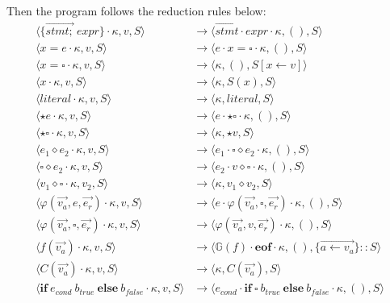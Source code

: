 \documentclass[a4paper,11pt]{article}
\newcommand\rtstate[3]{\langle #1, #2, #3\rangle}
\begin{document}
Then the program follows the reduction rules below:
\begin{align*}
\rtstate{\{\overrightarrow{stmt;}\ expr\} \cdot \kappa}{v}{S} &\rightarrow \rtstate{\overrightarrow{stmt} \cdot expr \cdot \kappa}{()}{S}\\
\rtstate{x = e \cdot \kappa}{v}{S} &\rightarrow \rtstate{e \cdot x = \square \cdot \kappa}{()}{S}\\
\rtstate{x = \square \cdot \kappa}{v}{S} &\rightarrow \rtstate{\kappa}{()}{S[x \leftarrow v]}\\
\rtstate{x \cdot \kappa}{v}{S} &\rightarrow \rtstate{\kappa}{S(x)}{S}\\
\rtstate{literal \cdot \kappa}{v}{S} &\rightarrow \rtstate{\kappa}{literal}{S}\\
\rtstate{\star e \cdot \kappa}{v}{S} &\rightarrow \rtstate{e \cdot \star \square \cdot \kappa}{()}{S}\\
\rtstate{\star \square \cdot \kappa}{v}{S} &\rightarrow \rtstate{\kappa}{\star v}{S}\\
\rtstate{e_1 \diamond e_2 \cdot \kappa}{v}{S} &\rightarrow \rtstate{e_1 \cdot \square \diamond e_2 \cdot \kappa}{()}{S}\\
\rtstate{\square \diamond e_2 \cdot \kappa}{v}{S} &\rightarrow \rtstate{e_2 \cdot v \diamond \square \cdot \kappa}{()}{S}\\
\rtstate{v_1 \diamond \square \cdot \kappa}{v_2}{S} &\rightarrow \rtstate{\kappa}{v_1 \diamond v_2}{S}\\
\rtstate{\varphi(\overrightarrow{v_a}, e, \overrightarrow{e_r}) \cdot \kappa}{v}{S} &\rightarrow \rtstate{e \cdot \varphi(\overrightarrow{v_a}, \square, \overrightarrow{e_r}) \cdot \kappa}{()}{S}\\
\rtstate{\varphi(\overrightarrow{v_a}, \square, \overrightarrow{e_r}) \cdot \kappa}{v}{S} &\rightarrow \rtstate{\varphi(\overrightarrow{v_a}, v, \overrightarrow{e_r}) \cdot \kappa}{()}{S}\\
\rtstate{f(\overrightarrow{v_a}) \cdot \kappa}{v}{S} &\rightarrow \rtstate{\mathbb{G}(f) \cdot \mathbf{eof} \cdot \kappa}{()}{\{\overrightarrow{a \leftarrow v_a}\} :: S}\\
\rtstate{C(\overrightarrow{v_a}) \cdot \kappa}{v}{S} &\rightarrow \rtstate{\kappa}{C(\overrightarrow{v_a})}{S}\\
\rtstate{\mathbf{if}\ e_{cond}\ b_{true}\ \mathbf{else}\ b_{false} \cdot  \kappa}{v}{S} &\rightarrow \rtstate{e_{cond} \cdot \mathbf{if}\ \square\ b_{true}\ \mathbf{else}\ b_{false} \cdot \kappa}{()}{S}\\

\end{align*}
\end{document}
